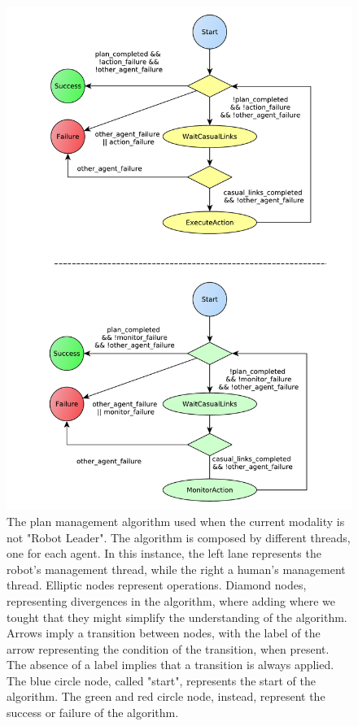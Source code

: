 \begin{figure}[ht!]
 \centering
 \includegraphics[scale=0.6]{img/plan_management/manage_plan_not_leader.pdf}
 \caption{The plan management algorithm used when the current modality is not "Robot Leader". The algorithm is composed by different threads, one for each agent. In this instance, the left lane represents the robot's management thread, while the right a human's management thread. Elliptic nodes represent operations. Diamond nodes, representing divergences in the algorithm, where adding where we tought that they might simplify the understanding of the algorithm. Arrows imply a transition between nodes, with the label of the arrow representing the condition of the transition, when present. The absence of a label implies that a transition is always applied. The blue circle node, called "start", represents the start of the algorithm. The green and red circle node, instead, represent the success or failure of the algorithm.}
 \label{fig:plan_management-manage_plan_not_leader}
 \end{figure}

